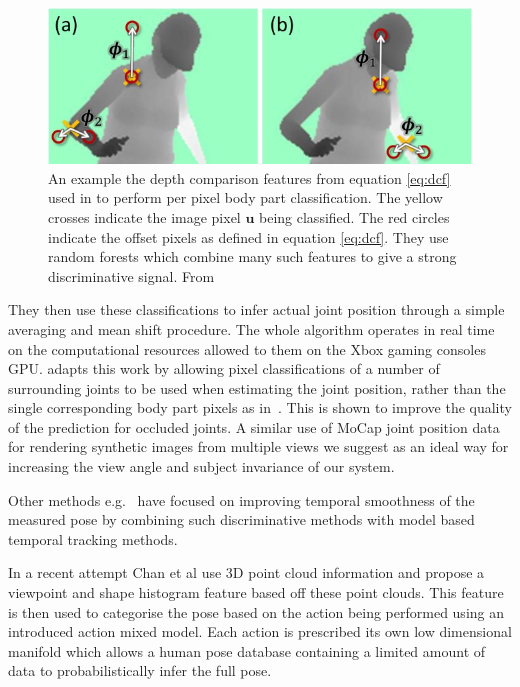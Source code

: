 \documentclass[11pt]{article} %
\begin{document}
\begin{figure}
\centering
\includegraphics*[width=0.6\linewidth,clip]{kinectFeature}
\caption{An example the depth comparison features from equation \ref{eq:dcf} used in \cite{Shotton2011} to perform per pixel body part classification. The yellow crosses indicate the image pixel $\boldsymbol{u}$ being classified. The red circles indicate the offset pixels as defined in equation \ref{eq:dcf}. They use random forests which combine many such features to give a strong discriminative signal. From~\cite{Shotton2011} \label{fig:dcf}  } 
\end{figure}

They then use these classifications to infer actual joint position through a simple averaging and mean shift procedure. The whole algorithm operates in real time on the computational resources allowed to them on the Xbox gaming consoles GPU. \cite{Shotton2013a} adapts this work by allowing pixel classifications of a number of surrounding joints to be used when estimating the joint position, rather than the single corresponding body part pixels as in~\cite{Shotton2011}. This is shown to improve the quality of the prediction for occluded joints. A similar use of MoCap joint position data for rendering synthetic images from multiple views we suggest as an ideal way for increasing the view angle and subject invariance of our system.


Other methods e.g.~\cite{Ye2011,Wei2011,Baak2011,Zhu2008} have focused on improving temporal smoothness of the measured pose by combining such discriminative methods with model based temporal tracking methods. 

In a recent attempt Chan et al \cite{Chan2014} use 3D point cloud information and propose a viewpoint and shape histogram feature based off these point clouds. This feature is then used to categorise the pose based on the action being performed using an introduced action mixed model. Each action is prescribed its own low dimensional manifold which allows a human pose database containing a limited amount of data to probabilistically infer the full pose.
\end{document}
